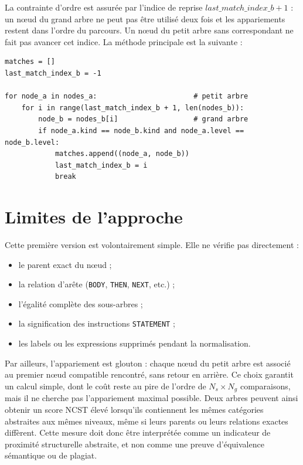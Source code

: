 \documentclass[12pt,a4paper,oneside]{report}
\begin{document}
La contrainte d'ordre est assurée par l'indice de reprise
$\mathit{last\_match\_index\_b} + 1$ : un nœud du grand arbre ne peut pas être
utilisé deux fois et les appariements restent dans l'ordre du parcours. Un
nœud du petit arbre sans correspondant ne fait pas avancer cet indice. La
méthode principale est la suivante :

\begin{lstlisting}[style=pyncst]
matches = []
last_match_index_b = -1

for node_a in nodes_a:                       # petit arbre
    for i in range(last_match_index_b + 1, len(nodes_b)):
        node_b = nodes_b[i]                  # grand arbre
        if node_a.kind == node_b.kind and node_a.level == node_b.level:
            matches.append((node_a, node_b))
            last_match_index_b = i
            break
\end{lstlisting}

\section{Limites de l'approche}


Cette première version est volontairement simple. Elle ne vérifie pas
directement :
\begin{itemize}
  \item le parent exact du nœud ;
  \item la relation d'arête (\texttt{BODY}, \texttt{THEN}, \texttt{NEXT}, etc.) ;
  \item l'égalité complète des sous-arbres ;
  \item la signification des instructions \texttt{STATEMENT} ;
  \item les labels ou les expressions supprimés pendant la normalisation.
\end{itemize}

Par ailleurs, l'appariement est glouton : chaque nœud du petit arbre est
associé au premier nœud compatible rencontré, sans retour en arrière. Ce choix
garantit un calcul simple, dont le coût reste au pire de l'ordre de
$N_s \times N_g$ comparaisons, mais il ne cherche pas l'appariement maximal
possible. Deux
arbres peuvent ainsi obtenir un score NCST élevé lorsqu'ils contiennent les
mêmes catégories abstraites aux mêmes niveaux, même si leurs parents ou leurs
relations exactes diffèrent. Cette mesure doit donc être interprétée comme un
indicateur de proximité structurelle abstraite, et non comme une preuve
d'équivalence sémantique ou de plagiat.
\end{document}
